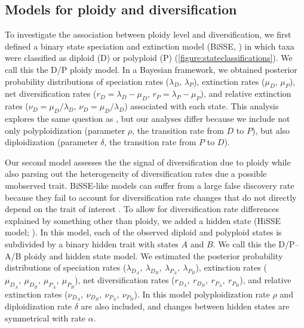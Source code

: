 
\subsection{Models for ploidy and diversification}

To investigate the association between ploidy level and diversification, we first defined a binary state speciation and extinction model (BiSSE, \citealt{maddison_2007}) in which taxa were classified as diploid (D) or polyploid (P) (\cref{figure:stateclassifications}).
We call this the D/P ploidy model. 
In a Bayesian framework, we obtained posterior probability distributions of speciation rates ($\lambda_D$, $\lambda_P$), extinction rates ($\mu_D$, $\mu_P$), net diversification rates ($r_D=\lambda_D-\mu_D$, $r_P=\lambda_P-\mu_P$), and relative extinction rates ($\nu_D=\mu_D / \lambda_D$, $\nu_D=\mu_D / \lambda_D$) associated with each state.
This analysis explores the same question as \citet{mayrose_2011, mayrose_2015}, but our analyses differ because we include not only polyploidization (parameter $\rho$, the transition rate from $D$ to $P$), but also diploidization (parameter $\delta$, the transition rate from $P$ to $D$). %

Our second model assesses the the signal of diversification due to ploidy while also parsing out the heterogeneity of diversification rates due a possible unobserved trait.
BiSSE-like models can suffer from a large false discovery rate because they fail to account for diversification rate changes that do not directly depend on the trait of interest \citep{rabosky_2015, beaulieu_2016}.
To allow for diversification rate differences explained by something other than ploidy, we added a hidden state (HiSSE model; \citealt{beaulieu_2016}).
In this model, each of the observed diploid and polyploid states is subdivided by a binary hidden trait with states $A$ and $B$.
We call this the D/P--A/B ploidy and hidden state model. 
We estimated the posterior probability distributions of speciation rates ($\lambda_{D_A},\ \lambda_{D_B},\ \lambda_{P_A},\ \lambda_{P_B}$), extinction rates ($\mu_{D_A},\ \mu_{D_B},\ \mu_{P_A},\ \mu_{P_B}$), net diversification rates ($r_{D_A},\ r_{D_B},\ r_{P_A},\ r_{P_B}$), and relative extinction rates ($\nu_{D_A},\ \nu_{D_B},\ \nu_{P_A},\ \nu_{P_B}$).
In this model polyploidization rate $\rho$ and diploidization rate $\delta$ are also included, and changes between hidden states are symmetrical with rate $\alpha$.

